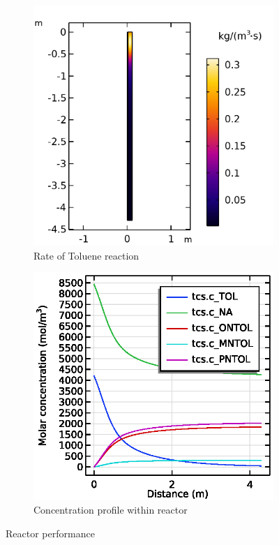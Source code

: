 \begin{figure}[h]
    \centering

    \begin{subfigure}{0.49\linewidth}
        \includegraphics[width=\linewidth]{figures/r_TOL.png}
        \caption{Rate of Toluene reaction}
        \label{fig:comsol-performance:r_TOL}
    \end{subfigure}
    \begin{subfigure}{0.49\linewidth}
        \includegraphics[width=\linewidth]{figures/concentration.eps}
        \caption{Concentration profile within reactor}
        \label{fig:comsol-performance:concentration}
    \end{subfigure}

    \caption{Reactor performance}
    \label{fig:comsol-performance}
\end{figure}

